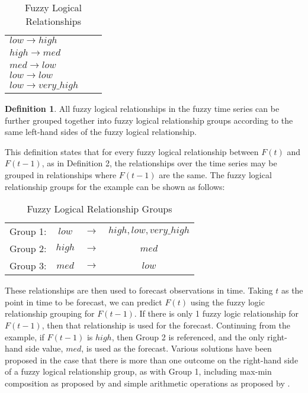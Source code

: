 \documentclass{article}
\theoremstyle{definition}
\newtheorem{ftsdef}{Definition}
\begin{document}
\begin{table}[h]
	\center
	\begin{tabular}{ l l l }
  	$low \rightarrow high$  \\
  	$high \rightarrow med$ \\
  	$med \rightarrow low$ \\
  	$low \rightarrow low$ \\
  	$low \rightarrow very\_high$ \\
	\end{tabular}
	\caption{Fuzzy Logical Relationships}
\end{table}

\begin{ftsdef}
All fuzzy logical relationships in the fuzzy time series can be further grouped together into fuzzy logical relationship groups according to the same left-hand sides of the fuzzy logical relationship.
\end{ftsdef}

This definition states that for every fuzzy logical relationship between $F(t)$ and $F(t-1)$, as in Definition 2, the relationships over the time series may be grouped in relationships where $F(t-1)$ are the same. The fuzzy logical relationship groups for the example can be shown as follows:

\begin{table}[h]
	\center
	\begin{tabular}{ c c c c }
  	Group 1: & $low$ & $\rightarrow$ & $high, low, very\_high$ \\
  	Group 2: & $high$ & $\rightarrow$ & $med$ \\
  	Group 3: & $med$ & $\rightarrow$ & $low$ \\
	\end{tabular}
	\caption{Fuzzy Logical Relationship Groups}
\end{table}

These relationships are then used to forecast observations in time. Taking $t$ as the point in time to be forecast, we can predict $F(t)$ using the fuzzy logic relationship grouping for $F(t-1)$. If there is only 1 fuzzy logic relationship for $F(t-1)$, then that relationship is used for the forecast. Continuing from the example, if $F(t-1)$ is $high$, then Group 2 is referenced, and the only right-hand side value, $med$, is used as the forecast. Various solutions have been proposed in the case that there is more than one outcome on the right-hand side of a fuzzy logical relationship group, as with Group 1, including max-min composition as proposed by \cite{song1993forecasting} and simple arithmetic operations as proposed by \cite{chen1996forecasting}.
\end{document}
